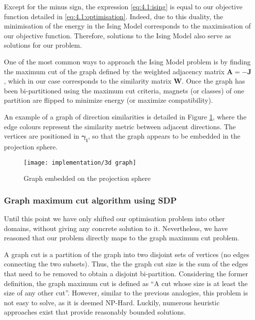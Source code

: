 \documentclass[../main.tex]{subfiles}
\begin{document}
Except for the minus sign, the expression \eqref{eq:4.1:ising} is equal to our objective function detailed in \eqref{eq:4.1:optimisation}. Indeed, due to this duality, the minimisation of the energy in the Ising Model corresponds to the maximisation of our objective function. Therefore, solutions to the Ising Model also serve as solutions for our problem. 

One of the most common ways to approach the Ising Model problem is by finding the maximum cut of the graph defined by the weighted adjacency matrix $\bm{A} = -\bm{J}$, which in our case corresponds to the similarity matrix $\bm{W}$. Once the graph has been bi-partitioned using the maximum cut criteria, magnets (or classes) of one partition are flipped to minimize energy (or maximize compatibility)\cite{kennedy2008}.

An example of a graph of direction similarities is detailed in Figure \ref{fig:4.1:graph}, where the edge colours represent the similarity metric between adjacent directions. The vertices are positioned in $\bm{\gamma_i}$, so that the graph appears to be embedded in the projection sphere.

\begin{figure}[hbp]
    \centering
    \texttt{[image: implementation/3d graph]}
    \caption{Graph embedded on the projection sphere}
    \label{fig:4.1:graph}
\end{figure}

\subsubsection{Graph maximum cut algorithm using SDP}
Until this point we have only shifted our optimisation problem into other domains, without giving any concrete solution to it. Nevertheless, we have reasoned that our problem directly maps to the graph maximum cut problem.

A graph cut is a partition of the graph into two disjoint sets of vertices (no edges connecting the two subsets). Thus, the the graph cut size is the sum of the edges that need to be removed to obtain a disjoint bi-partition. Considering the former definition, the graph maximum cut is defined as ``A cut whose size is at least the size of any other cut''\cite{sudakov2005}. However, similar to the previous analogies, this problem is not easy to solve, as it is deemed NP-Hard\cite{chan2014}. Luckily, numerous heuristic approaches exist that provide reasonably bounded solutions.
\end{document}
